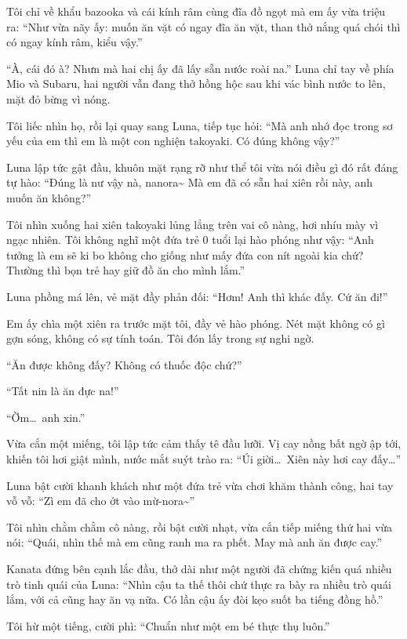 \documentclass[../main.tex]{subfiles}
\begin{document}
Tôi chỉ về khẩu bazooka và cái kính râm cùng đĩa đồ ngọt mà em ấy vừa triệu ra: ``Như vừa nãy ấy: muốn ăn vặt có ngay đĩa ăn vặt, than thở nắng quá chói thì có ngay kính râm, kiểu vậy.''

``À, cái đó à? Nhưn mà hai chị ấy đã lấy sẵn nước roài na.'' Luna chỉ tay về phía Mio và Subaru, hai người vẫn đang thở hồng hộc sau khi vác bình nước to lên, mặt đỏ bừng vì nóng.

Tôi liếc nhìn họ, rồi lại quay sang Luna, tiếp tục hỏi: ``Mà anh nhớ đọc trong sơ yếu của em thì em là một con nghiện takoyaki. Có đúng không vậy?''

Luna lập tức gật đầu, khuôn mặt rạng rỡ như thể tôi vừa nói điều gì đó rất đáng tự hào: ``Đúng là nư vậy nà, nanora\~{} Mà em đã có sẵn hai xiên rồi này, anh muốn ăn không?''

Tôi nhìn xuống hai xiên takoyaki lủng lẳng trên vai cô nàng, hơi nhíu mày vì ngạc nhiên. Tôi không nghĩ một đứa trẻ 0 tuổi lại hào phóng như vậy: ``Anh tưởng là em sẽ ki bo không cho giống như mấy đứa con nít ngoài kia chứ? Thường thì bọn trẻ hay giữ đồ ăn cho mình lắm.''

Luna phồng má lên, vẻ mặt đầy phản đối: ``Hơm! Anh thì khác đấy. Cứ ăn đi!''

Em ấy chìa một xiên ra trước mặt tôi, đầy vẻ hào phóng. Nét mặt không có gì gợn sóng, không có sự tính toán. Tôi đón lấy trong sự nghi ngờ.

``Ăn được không đấy? Không có thuốc độc chứ?''

``Tất nin là ăn đực na!''

``Ờm\dots\ anh xin.''

Vừa cắn một miếng, tôi lập tức cảm thấy tê đầu lưỡi. Vị cay nồng bất ngờ ập tới, khiến tôi hơi giật mình, nước mắt suýt trào ra: ``Úi giời\dots\ Xiên này hơi cay đấy\dots''

Luna bật cười khanh khách như một đứa trẻ vừa chơi khăm thành công, hai tay vỗ vỗ: ``Zì em đã cho ớt vào mừ-nora\~{}''

Tôi nhìn chằm chằm cô nàng, rồi bật cười nhạt, vừa cắn tiếp miếng thứ hai vừa nói: ``Quái, nhìn thế mà em cũng ranh ma ra phết. May mà anh ăn được cay.''

Kanata đứng bên cạnh lắc đầu, thở dài như một người đã chứng kiến quá nhiều trò tinh quái của Luna: ``Nhìn cậu ta thế thôi chứ thực ra bày ra nhiều trò quái lắm, với cả cũng hay ăn vạ nữa. Có lần cậu ấy đòi kẹo suốt ba tiếng đồng hồ.''

Tôi hừ một tiếng, cười phì: ``Chuẩn như một em bé thực thụ luôn.''
\end{document}
